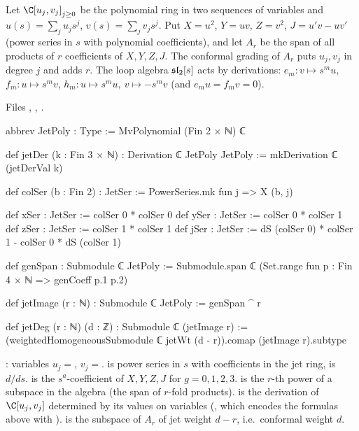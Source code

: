 \begin{definition}\label{l28:def:jet}
Let $\C[u_j,v_j]_{j\ge0}$ be the polynomial ring in two sequences of variables and $u(s)=\sum_ju_js^j$, $v(s)=\sum_jv_js^j$. Put
$X=u^2$, $Y=uv$, $Z=v^2$, $J=u'v-uv'$ (power series in $s$ with polynomial coefficients), and let $A_r$ be the span of all products of $r$ coefficients
of $X,Y,Z,J$. The conformal grading of $A_r$ puts $u_j,v_j$ in degree $j$ and adds $r$. The loop algebra $\mathfrak{sl}_2[s]$ acts by derivations:
$e_m\colon v\mapsto s^mu$, $f_m\colon u\mapsto s^mv$, $h_m\colon u\mapsto s^mu,\ v\mapsto-s^mv$ (and $e_mu=f_mv=0$).
\end{definition}

\noindent Files , ,
.
\begin{leancode}
abbrev JetPoly : Type := MvPolynomial (Fin 2 × ℕ) ℂ

def jetDer (k : Fin 3 × ℕ) : Derivation ℂ JetPoly JetPoly := mkDerivation ℂ (jetDerVal k)

def colSer (b : Fin 2) : JetSer := PowerSeries.mk fun j => X (b, j)

def xSer : JetSer := colSer 0 * colSer 0
def ySer : JetSer := colSer 0 * colSer 1
def zSer : JetSer := colSer 1 * colSer 1
def jSer : JetSer := dS (colSer 0) * colSer 1 - colSer 0 * dS (colSer 1)

def genSpan : Submodule ℂ JetPoly :=
  Submodule.span ℂ (Set.range fun p : Fin 4 × ℕ => genCoeff p.1 p.2)

def jetImage (r : ℕ) : Submodule ℂ JetPoly := genSpan ^ r

def jetDeg (r : ℕ) (d : ℤ) : Submodule ℂ (jetImage r) :=
  (weightedHomogeneousSubmodule ℂ jetWt (d - r)).comap (jetImage r).subtype

\end{leancode}

\begin{dictionary}
: variables $u_j=$, $v_j=$.  is power series in $s$ with coefficients in
the jet ring,  is $d/ds$.  is the $s^a$-coefficient of $X,Y,Z,J$ for $g=0,1,2,3$.  is the $r$-th power
of a subspace in the algebra (the span of $r$-fold products).  is the derivation of $\C[u_j,v_j]$ determined by its values on
variables (, which encodes the formulas above with ).  is the subspace of $A_r$ of jet weight
$d-r$, i.e.\ conformal weight $d$.
\end{dictionary}

